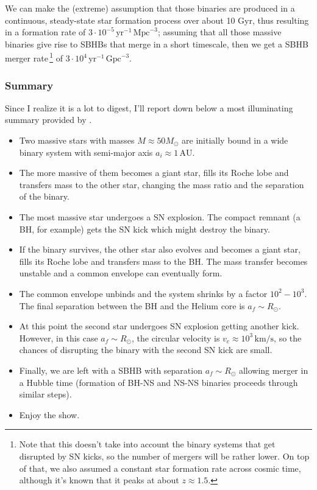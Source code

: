 \par We can make the (extreme) assumption that those binaries are produced in a continuous, steady-state star formation process over about 10 Gyr, thus resulting in a formation rate of $3\cdot 10^{-5}\,\text{yr}^{-1}\,\text{Mpc}^{-3}$; assuming that all those massive binaries give rise to SBHBs that merge in a short timescale, then we get a SBHB merger rate\,\footnote{Note that this doesn't take into account the binary systems that get disrupted by SN kicks, so the number of mergers will be rather lower. On top of that, we also assumed a constant star formation rate across cosmic time, although it's known that it peaks at about $z\approx 1.5$.} of $3\cdot 10^{4}\,\text{yr}^{-1}\,\text{Gpc}^{-3}$.
\subsubsection*{Summary}
Since I realize it is a lot to digest, I'll report down below a most illuminating summary provided by \cite{celoria2018lecturenotesblackhole}.
\begin{itemize}
    \item Two massive stars with masses $M \approx 50M_{\odot}$ are initially bound in a wide binary system with semi-major axis $a_{i} \approx 1\,\text{AU}$.
    \item The more massive of them becomes a giant star, fills its Roche lobe and transfers mass to the other star, changing the mass ratio and the separation of the binary.
    \item The most massive star undergoes a SN explosion. The compact remnant (a BH, for example) gets the SN kick which might destroy the binary.
    \item If the binary survives, the other star also evolves and becomes a giant star, fills its Roche lobe and transfers mass to the BH. The mass transfer becomes unstable and a common envelope can eventually form.
    \item The common envelope unbinds and the system shrinks by a factor $10^{2}-10^{3}$. The final separation between the BH and the Helium core is $a_{f} \sim R_{\odot}$.
    \item At this point the second star undergoes SN explosion getting another kick. However, in this case $a_{f} \sim R_{\odot}$, the circular velocity is $v_{c}\approx 10^{3}\,\text{km}/\text{s}$, so the chances of disrupting the binary with the second SN kick are small.
    \item Finally, we are left with a SBHB with separation $a_{f} \sim R_{\odot}$ allowing merger in a Hubble time (formation of BH-NS and NS-NS binaries proceeds through similar steps).
    \item Enjoy the show.
\end{itemize}
